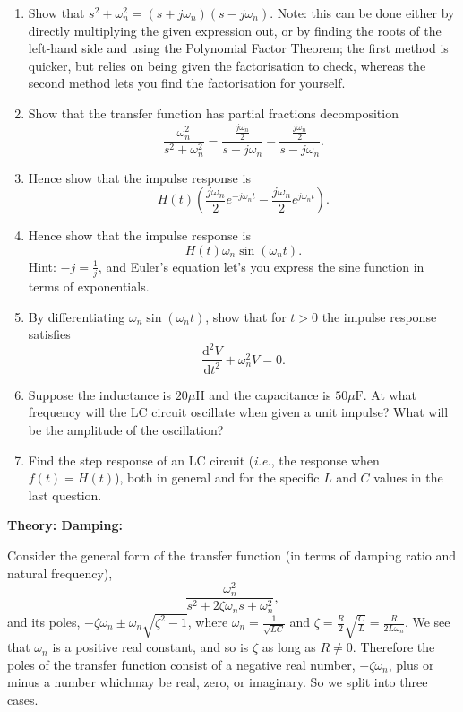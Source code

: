 \documentclass{article}
\newcommand{\deriv}[3][]{\frac{\mathrm{d}^{#1}#2}{\mathrm{d}#3^{#1}}}
\begin{document}
\begin{enumerate}
	\item Show that $s^2+\omega_n^2=(s+j\omega_n)(s-j\omega_n)$. Note: this can be done either by directly multiplying the given expression out, or by finding the roots of the left-hand side and using the Polynomial Factor Theorem; the first method is quicker, but relies on being given the factorisation to check, whereas the second method lets you find the factorisation for yourself.
	\item Show that the transfer function has partial fractions decomposition
		\[\frac{\omega_n^2}{s^2+\omega_n^2}=\frac{\frac{j\omega_n}{2}}{s+j\omega_n}-\frac{\frac{j\omega_n}{2}}{s-j\omega_n}.\]
	\item Hence show that the impulse response is
		\[H(t)\left(\frac{j\omega_n}{2}e^{-j\omega_n t} - \frac{j\omega_n}{2}e^{j\omega_n t}\right).\]
	\item Hence show that the impulse response is
		\[H(t)\omega_n\sin(\omega_n t).\]
		Hint: $-j=\frac{1}{j}$, and Euler's equation let's you express the sine function in terms of exponentials.
	\item By differentiating $\omega_n\sin(\omega_nt)$, show that for $t>0$ the impulse response satisfies
		\[\deriv[2]{V}{t}+\omega_n^2V = 0.\]
	\item Suppose the inductance is $20\mu\mathrm{H}$ and the capacitance is $50\mu\mathrm{F}$. At what frequency will the LC circuit oscillate when given a unit impulse? What will be the amplitude of the oscillation?
	\item Find the step response of an LC circuit (\textit{i.e.}, the response when $f(t)=H(t)$), both in general and for the specific $L$ and $C$ values in the last question.
\end{enumerate}


\clearpage



\textbf{Theory: Damping:}\bigskip


Consider the general form of the transfer function (in terms of damping ratio and natural frequency),
\[\frac{\omega_n^2}{s^2+2\zeta\omega_ns+\omega_n^2},\]
and its poles, $-\zeta\omega_n\pm\omega_n\sqrt{\zeta^2-1}$, where $\omega_n=\frac{1}{\sqrt{LC}}$ and $\zeta=\frac{R}{2}\sqrt{\frac{C}{L}}=\frac{R}{2L\omega_n}$. We see that $\omega_n$ is a positive real constant, and so is $\zeta$ as long as $R\neq 0$. Therefore the poles of the transfer function consist of a negative real number, $-\zeta\omega_n$, plus or minus a number whichmay be real, zero, or imaginary. So we split into three cases.\bigskip
\end{document}
